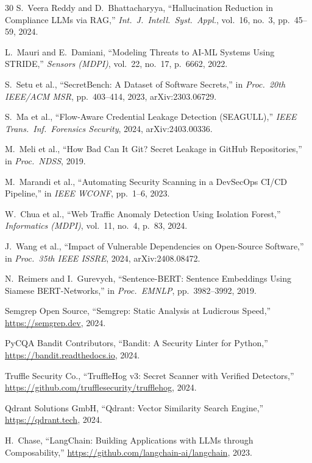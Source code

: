\documentclass[conference]{IEEEtran}
\begin{document}
\begin{thebibliography}{30}
S.~Veera Reddy and D.~Bhattacharyya,
``Hallucination Reduction in Compliance LLMs via RAG,''
\textit{Int.\ J.\ Intell.\ Syst.\ Appl.}, vol.~16, no.~3, pp.~45--59, 2024.

L.~Mauri and E.~Damiani,
``Modeling Threats to AI-ML Systems Using STRIDE,''
\textit{Sensors (MDPI)}, vol.~22, no.~17, p.~6662, 2022.

S.~Setu et al.,
``SecretBench: A Dataset of Software Secrets,''
in \textit{Proc.\ 20th IEEE/ACM MSR}, pp.~403--414, 2023, arXiv:2303.06729.

S.~Ma et al.,
``Flow-Aware Credential Leakage Detection (SEAGULL),''
\textit{IEEE Trans.\ Inf.\ Forensics Security}, 2024, arXiv:2403.00336.

M.~Meli et al.,
``How Bad Can It Git? Secret Leakage in GitHub Repositories,''
in \textit{Proc.\ NDSS}, 2019.

M.~Marandi et al.,
``Automating Security Scanning in a DevSecOps CI/CD Pipeline,''
in \textit{IEEE WCONF}, pp.~1--6, 2023.

W.~Chua et al.,
``Web Traffic Anomaly Detection Using Isolation Forest,''
\textit{Informatics (MDPI)}, vol.~11, no.~4, p.~83, 2024.

J.~Wang et al.,
``Impact of Vulnerable Dependencies on Open-Source Software,''
in \textit{Proc.\ 35th IEEE ISSRE}, 2024, arXiv:2408.08472.

N.~Reimers and I.~Gurevych,
``Sentence-BERT: Sentence Embeddings Using Siamese BERT-Networks,''
in \textit{Proc.\ EMNLP}, pp.~3982--3992, 2019.

Semgrep Open Source,
``Semgrep: Static Analysis at Ludicrous Speed,''
\url{https://semgrep.dev}, 2024.

PyCQA Bandit Contributors,
``Bandit: A Security Linter for Python,''
\url{https://bandit.readthedocs.io}, 2024.

Truffle Security Co.,
``TruffleHog v3: Secret Scanner with Verified Detectors,''
\url{https://github.com/trufflesecurity/trufflehog}, 2024.

Qdrant Solutions GmbH,
``Qdrant: Vector Similarity Search Engine,''
\url{https://qdrant.tech}, 2024.

H.~Chase,
``LangChain: Building Applications with LLMs through Composability,''
\url{https://github.com/langchain-ai/langchain}, 2023.


\end{thebibliography}
\end{document}
